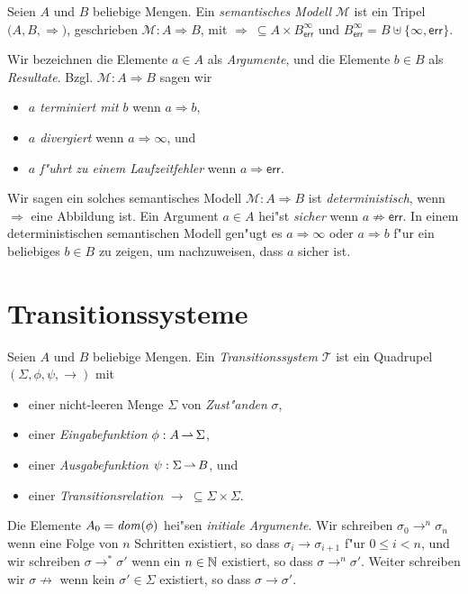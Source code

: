 \documentclass[12pt,a4paper,final]{article}
\begin{document}
\begin{definition}
  Seien $A$ und $B$ beliebige Mengen.
  Ein \emph{semantisches Modell} $\mathcal{M}$ ist ein Tripel $\bigl(A, B, \Rightarrow\bigr)$,
  geschrieben $\mathcal{M}: A \Rightarrow B$, mit \mbox{$\Rightarrow\ \subseteq A \times B^\infty_{\mathsf{err}}$}
  und $B^\infty_{\mathsf{err}} = B \uplus \{\infty,\mathsf{err}\}$.
\end{definition}
Wir bezeichnen die Elemente $a \in A$ als \emph{Argumente}, und die Elemente $b \in B$
als \emph{Resultate}. Bzgl. $\mathcal{M}: A \Rightarrow B$ sagen wir
\begin{itemize}
\item \emph{$a$ terminiert mit $b$} wenn $a \Rightarrow b$,
\item \emph{$a$ divergiert} wenn $a \Rightarrow \infty$, und
\item \emph{$a$ f"uhrt zu einem Laufzeitfehler} wenn $a \Rightarrow \mathsf{err}$.
\end{itemize}
Wir sagen ein solches semantisches Modell \mbox{$\mathcal{M}: A \Rightarrow B$} ist \emph{deterministisch},
wenn $\Rightarrow$ eine Abbildung ist. Ein Argument \mbox{$a \in A$} hei"st \emph{sicher} wenn
\mbox{$a \not\Rightarrow \mathsf{err}$}. In einem deterministischen semantischen Modell gen"ugt es
\mbox{$a \Rightarrow \infty$} oder \mbox{$a \Rightarrow b$} f"ur ein beliebiges \mbox{$b \in B$} zu zeigen,
um nachzuweisen, dass $a$ sicher ist.



\section{Transitionssysteme}
\label{sec:Transitionssysteme}

\begin{definition}[Transitionssystem]
  Seien $A$ und $B$ beliebige Mengen.
  Ein \emph{Transitionssystem} $\mathcal{T}$ ist ein Quadrupel \mbox{$(\Sigma,\phi,\psi,\rightarrow)$} mit
  \begin{itemize}
  \item einer nicht-leeren Menge $\Sigma$ von \emph{Zust"anden} $\sigma$,
  \item einer \emph{Eingabefunktion} \mbox{$\phi:A \operatorname{\rightharpoonup} \Sigma$},
  \item einer \emph{Ausgabefunktion} \mbox{$\psi:\Sigma \operatorname{\rightharpoonup} B$}, und
  \item einer \emph{Transitionsrelation} $\rightarrow\ \subseteq \Sigma \times \Sigma$.
  \end{itemize}
\end{definition}
Die Elemente $A_0 = \operatorname{\mathit{dom}}(\phi)$ hei"sen \emph{initiale Argumente}. Wir schreiben
\mbox{$\sigma_0 \rightarrow^n \sigma_n$} wenn eine Folge von $n$ Schritten existiert,
so dass \mbox{$\sigma_i \rightarrow \sigma_{i+1}$} f"ur $0 \le i < n$, und wir schreiben
\mbox{$\sigma \rightarrow^* \sigma'$} wenn ein $n \in \mathbb N$ existiert, so dass
\mbox{$\sigma \rightarrow^n \sigma'$}. Weiter schreiben wir \mbox{$\sigma \not\rightarrow$}
wenn kein $\sigma' \in \Sigma$ existiert, so dass \mbox{$\sigma \rightarrow \sigma'$}.
\end{document}
